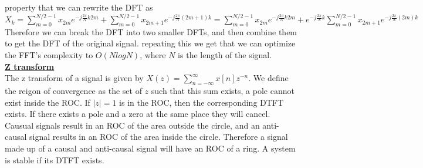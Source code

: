 \documentclass[9pt]{article}
\begin{document}
property that we can rewrite the DFT as 
$X_k=\sum_{m=0}^{N/2-1}x_{2m}e^{-j\frac{2\pi}{N}k2m}+\sum_{m=0}^{N/2-1}x_{2m+1}e^{-j\frac{2\pi}{N}(2m+1)k}
=\sum_{m=0}^{N/2-1}x_{2m}e^{-j\frac{2\pi}{N}k2m}+e^{-j\frac{2\pi}{N}k}\sum_{m=0}^{N/2-1}x_{2m+1}e^{-j\frac{2\pi}{N}(2m)k}$
Therefore we can break the DFT into two smaller DFTs, and then combine them to get the DFT of the original signal.
repeating this we get that we can optimize the FFT's complexity to 
$O(NlogN)$, where $N$ is the length of the signal.\\
\underline{\textbf{Z transform}}\\
The z transform of a signal is given by $X(z)=\sum_{n=-\infty}^{\infty}x[n]z^{-n}$. We define the 
reigon of convergence as the set of $z$ such that this sum exists, a pole 
cannot exist inside the ROC. If $|z|=1$
is in the ROC, then the corresponding DTFT exists. If there exists 
a pole and a zero at the same place they will cancel. Causual signals
result in an ROC of the area outside the circle, and an anti-causal signal
results in an ROC of the area inside the circle. Therefore a signal 
made up of a causal and anti-causal signal will have an ROC of a ring. A system
is stable if its DTFT exists.
\end{document}
